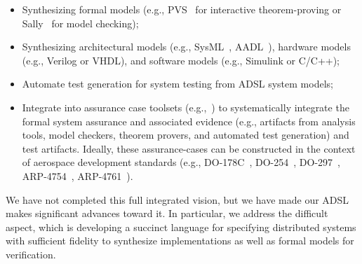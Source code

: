 \begin{itemize}
\item Synthesizing formal models (e.g., PVS~\cite{SRI:PVS} for interactive theorem-proving or Sally~\cite{sally} for model checking);
\item Synthesizing architectural models (e.g., SysML~\cite{SysML}, AADL~\cite{feiler06aadl-intro,as5506}), hardware models (e.g., Verilog or VHDL), and software models (e.g., Simulink or C/C++);
\item Automate test generation for system testing from ADSL system models;

\item Integrate into assurance case toolsets (e.g.,~\cite{Rushby05anevidential,CruanesHOS13}) to systematically integrate the
  formal system assurance and associated evidence (e.g., artifacts from analysis
  tools, model checkers, theorem provers, and automated test generation) and
  test artifacts. Ideally, these assurance-cases can be constructed in the context of aerospace development
  standards (e.g., DO-178C~\cite{do178c}, DO-254~\cite{do254}, DO-297~\cite{do297}, ARP-4754~\cite{arp4754}, ARP-4761~\cite{arp4761}).

\end{itemize}

\noindent
We have not completed this full integrated vision, but we have made our ADSL makes significant advances toward it. In particular, we address the difficult aspect, which is developing a succinct language for specifying distributed systems with sufficient fidelity to synthesize implementations as well as formal models for verification.

